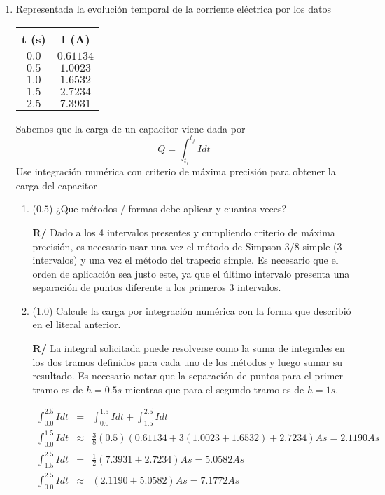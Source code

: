 \documentclass[12pt]{article}
\begin{document}
\vspace{-.5cm}
  \begin{enumerate}[leftmargin=*,widest=9]


    \item Representada la evolución temporal de la corriente eléctrica por los datos

    \begin{center}
   		\begin{tabular}{ | c | c | }
     \hline
     t (s) & I (A) \\ \hline
     $0.0$ & $0.61134$ \\ \hline
     $0.5$ & $1.0023$ \\ \hline
     $1.0$ & $1.6532$ \\ \hline
     $1.5$ & $2.7234$ \\ \hline
     $2.5$ & $7.3931$ \\
     \hline
   		\end{tabular}
 	\end{center}

   Sabemos que la carga de un capacitor viene dada por $$Q = \int_{t_i}^{t_f} I dt$$ Use integración numérica con criterio de máxima precisión para obtener la carga del capacitor
   \begin{enumerate}[label=\alph*]
    \item (\(0.5\)) ¿Que métodos / formas debe aplicar y cuantas veces?


    \textbf{R/} Dado a los 4 intervalos presentes y cumpliendo criterio de máxima precisión, es necesario usar una vez el método de Simpson 3/8 simple (3 intervalos) y una vez el método del trapecio simple. Es necesario que el orden de aplicación sea justo este, ya que el último intervalo presenta una separación de puntos diferente a los primeros 3 intervalos.

    \item (\(1.0\)) Calcule la carga por integración numérica con la forma que describió en el literal anterior.


\textbf{R/} La integral solicitada puede resolverse como la suma de integrales en los dos tramos definidos para cada uno de los métodos y luego sumar su resultado. Es necesario notar que la separación de puntos para el primer tramo es de \(h=0.5s\) mientras que para el segundo tramo es de \(h=1s\).

\begin{eqnarray*}
\int_{0.0}^{2.5}Idt &=& \int_{0.0}^{1.5}Idt + \int_{1.5}^{2.5}Idt \\
\int_{0.0}^{1.5}Idt &\approx & \frac{3}{8}(0.5)(0.61134 + 3(1.0023+1.6532)+2.7234)As = 2.1190As\\
\int_{1.5}^{2.5}Idt &=& \frac{1}{2}(7.3931+2.7234)As = 5.0582As\\
\int_{0.0}^{2.5}Idt &\approx & (2.1190+5.0582)As = 7.1772As
\end{eqnarray*}


\end{enumerate}
\end{enumerate}
\end{document}
